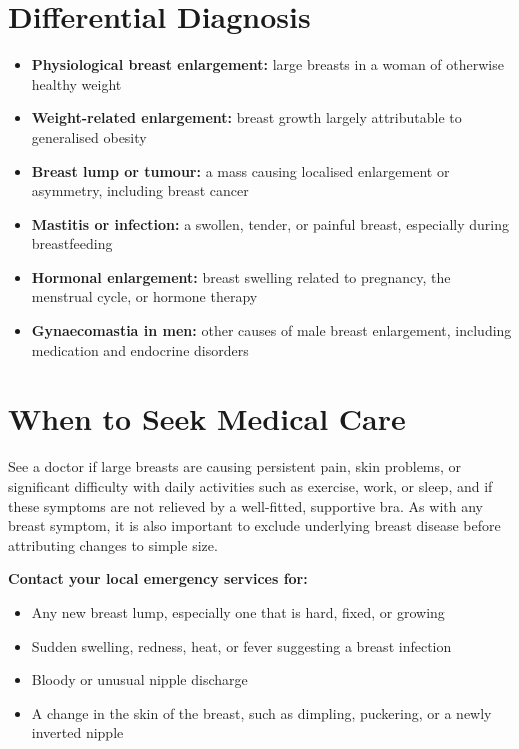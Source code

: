 \section*{Differential Diagnosis}
\begin{itemize}
    \item \textbf{Physiological breast enlargement:} large breasts in a woman of otherwise healthy weight
    \item \textbf{Weight-related enlargement:} breast growth largely attributable to generalised obesity
    \item \textbf{Breast lump or tumour:} a mass causing localised enlargement or asymmetry, including breast cancer
    \item \textbf{Mastitis or infection:} a swollen, tender, or painful breast, especially during breastfeeding
    \item \textbf{Hormonal enlargement:} breast swelling related to pregnancy, the menstrual cycle, or hormone therapy
    \item \textbf{Gynaecomastia in men:} other causes of male breast enlargement, including medication and endocrine disorders
\end{itemize}

\section*{When to Seek Medical Care}
See a doctor if large breasts are causing persistent pain, skin problems, or significant difficulty with daily activities such as exercise, work, or sleep, and if these symptoms are not relieved by a well-fitted, supportive bra. As with any breast symptom, it is also important to exclude underlying breast disease before attributing changes to simple size.

\textbf{Contact your local emergency services for:}
\begin{itemize}
    \item Any new breast lump, especially one that is hard, fixed, or growing
    \item Sudden swelling, redness, heat, or fever suggesting a breast infection
    \item Bloody or unusual nipple discharge
    \item A change in the skin of the breast, such as dimpling, puckering, or a newly inverted nipple
\end{itemize}

